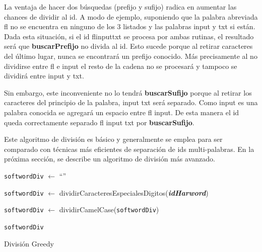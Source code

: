 La ventaja de hacer dos búsquedas (prefijo y sufijo) radica en aumentar las chances de dividir al id. A modo de ejemplo, suponiendo que la palabra abreviada \textsf{fl}
no se encuentra en ninguno de los 3 listados y las palabras \textsf{input} y \textsf{txt} si están. Dada esta situación, si el id \textsf{flinputtxt} se procesa por ambas rutinas, el resultado será que \textbf{buscarPrefijo} no divida al id. Esto sucede porque al retirar caracteres del último lugar, nunca se encontrará un prefijo conocido. Más precisamente al no dividirse entre \textsf{fl} e \textsf{input} el resto de la cadena no se procesará y tampoco se dividirá entre \textsf{input} y \textsf{txt}. 

Sin embargo, este inconveniente no lo tendrá \textbf{buscarSufijo} porque al retirar los caracteres del principio de la palabra, \textsf{input txt} será separado. Como \textsf{input} es una palabra conocida se agregará un espacio entre \textsf{fl input}. De esta manera el id queda correctamente separado \textsf{fl input txt} por \textbf{buscarSufijo}.

Este algoritmo de división es básico y generalmente se emplea para ser comparado con técnicas más eficientes de separación de ids multi-palabras. En la próxima sección, se describe un algoritmo de división más avanzado.

\begin{algorithm}[H]%
\LinesNumbered%

\BlankLine
\texttt{softwordDiv} $\leftarrow$ “”

\texttt{softwordDiv} $\leftarrow$ dividirCaracteresEspecialesDigitos(\textit{\textbf{idHarword}})

\texttt{softwordDiv} $\leftarrow$ dividirCamelCase(\texttt{softwordDiv})

\BlankLine
{}
\BlankLine
\Return \texttt{softwordDiv} 

\caption{División Greedy\label{GSA}}
\end{algorithm}

